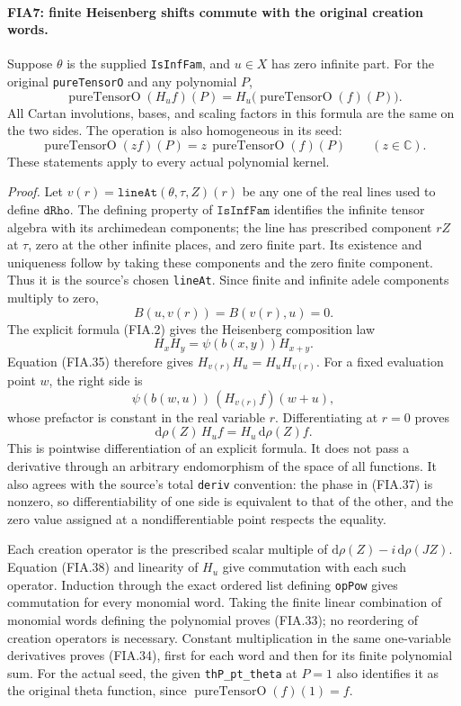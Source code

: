 \paragraph{FIA7: finite Heisenberg shifts commute with the original creation words.}
\label{claim:FIA7}
Suppose \(\theta\) is the supplied \texttt{IsInfFam}, and
\(u\in X\) has zero infinite part.  For the original
\texttt{pureTensorO} and any polynomial \(P\),
\[
 \operatorname{pureTensorO}(H_u f)(P)
       =H_u\bigl(\operatorname{pureTensorO}(f)(P)\bigr).
 \tag{FIA.33}
\]
All Cartan involutions, bases, and scaling factors in this
formula are the same on the two sides.  The operation is also
homogeneous in its seed:
\[
       \operatorname{pureTensorO}(z f)(P)
          =z\,\operatorname{pureTensorO}(f)(P)
                         \qquad(z\in\mathbb C).
 \tag{FIA.34}
\]
These statements apply to every actual polynomial kernel.

\emph{Proof.}
Let \(v(r)=\texttt{lineAt}(\theta,\tau,Z)(r)\) be any
one of the real lines used to define \(\texttt{dRho}\).
The defining property of \(\texttt{IsInfFam}\) identifies
the infinite tensor algebra with its archimedean components;
the line has prescribed component \(rZ\) at \(\tau\), zero
at the other infinite places, and zero finite part.
Its existence and uniqueness follow by taking these
components and the zero finite component.  Thus it is the
source's chosen \texttt{lineAt}.
Since finite and infinite adele components multiply to zero,
\[
                B(u,v(r))=B(v(r),u)=0.
 \tag{FIA.35}
\]
The explicit formula (FIA.2) gives the Heisenberg composition
law
\[
           H_xH_y=\psi(b(x,y))H_{x+y}.
 \tag{FIA.36}
\]
Equation (FIA.35) therefore gives
\(H_{v(r)}H_u=H_uH_{v(r)}\).
For a fixed evaluation point \(w\), the right side is
\[
     \psi(b(w,u))\,(H_{v(r)}f)(w+u),
 \tag{FIA.37}
\]
whose prefactor is constant in the real variable \(r\).
Differentiating at \(r=0\) proves
\[
       \mathrm d\rho(Z)\,H_u f
           =H_u\,\mathrm d\rho(Z)f.
 \tag{FIA.38}
\]
This is pointwise differentiation of an explicit formula.
It does not pass a derivative through an arbitrary endomorphism
of the space of all functions.
It also agrees with the source's total \texttt{deriv} convention:
the phase in (FIA.37) is nonzero, so differentiability of one
side is equivalent to that of the other, and the zero value
assigned at a nondifferentiable point respects the equality.

Each creation operator is the prescribed scalar multiple of
\(\mathrm d\rho(Z)-i\,\mathrm d\rho(JZ)\).
Equation (FIA.38) and linearity of \(H_u\) give commutation
with each such operator.  Induction through the exact ordered
list defining \texttt{opPow} gives commutation for every
monomial word.  Taking the finite linear combination of
monomial words defining the polynomial proves (FIA.33);
no reordering of creation operators is necessary.
Constant multiplication in the same one-variable derivatives
proves (FIA.34), first for each word and then for its finite
polynomial sum.
For the actual seed, the given
\texttt{thP\_pt\_theta} at \(P=1\) also identifies it as
the original theta function, since
\(\operatorname{pureTensorO}(f)(1)=f\).

